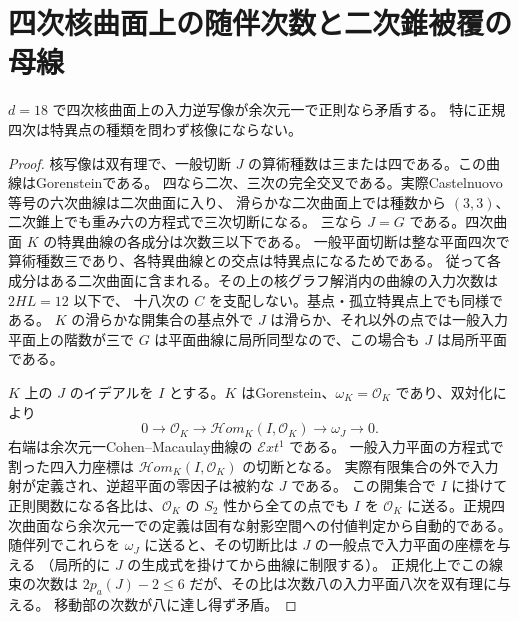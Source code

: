 \section{四次核曲面上の随伴次数と二次錐被覆の母線}
\label{sec:cofactor-eighteen-quartic-and-cone}
\begin{theorem}\label{thm:cofactor-eighteen-normal-quartic}
$d=18$ で四次核曲面上の入力逆写像が余次元一で正則なら矛盾する。
特に正規四次は特異点の種類を問わず核像にならない。
\end{theorem}
\begin{proof}
核写像は双有理で、一般切断 $J$ の算術種数は三または四である。この曲線はGorensteinである。
四なら二次、三次の完全交叉である。実際Castelnuovo等号の六次曲線は二次曲面に入り、
滑らかな二次曲面上では種数から $(3,3)$、二次錐上でも重み六の方程式で三次切断になる。
三なら $J=G$ である。四次曲面 $K$ の特異曲線の各成分は次数三以下である。
一般平面切断は整な平面四次で算術種数三であり、各特異曲線との交点は特異点になるためである。
従って各成分はある二次曲面に含まれる。その上の核グラフ解消内の曲線の入力次数は $2HL=12$ 以下で、
十八次の $C$ を支配しない。基点・孤立特異点上でも同様である。
$K$ の滑らかな開集合の基点外で $J$ は滑らか、それ以外の点では一般入力平面上の階数が三で
$G$ は平面曲線に局所同型なので、この場合も $J$ は局所平面である。

$K$ 上の $J$ のイデアルを $I$ とする。$K$ はGorenstein、$\omega_K=\mathcal O_K$ であり、双対化により
\[
 0\longrightarrow\mathcal O_K\longrightarrow\mathcal Hom_K(I,\mathcal O_K)
 \longrightarrow\omega_J\longrightarrow0 .
\]
右端は余次元一Cohen--Macaulay曲線の $\mathcal Ext^1$ である。
一般入力平面の方程式で割った四入力座標は $\mathcal Hom_K(I,\mathcal O_K)$ の切断となる。
実際有限集合の外で入力射が定義され、逆超平面の零因子は被約な $J$ である。
この開集合で $I$ に掛けて正則関数になる各比は、$\mathcal O_K$ の $S_2$ 性から全ての点でも $I$ を
$\mathcal O_K$ に送る。正規四次曲面なら余次元一での定義は固有な射影空間への付値判定から自動的である。
随伴列でこれらを $\omega_J$ に送ると、その切断比は $J$ の一般点で入力平面の座標を与える
（局所的に $J$ の生成式を掛けてから曲線に制限する）。
正規化上でこの線束の次数は $2p_a(J)-2\le6$ だが、その比は次数八の入力平面八次を双有理に与える。
移動部の次数が八に達し得ず矛盾。
\end{proof}

